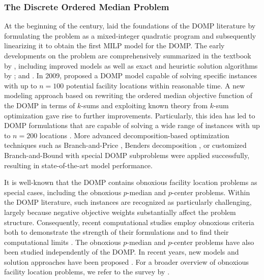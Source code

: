 \documentclass[letterpaper]{article}
\begin{document}
\subsubsection{The Discrete Ordered Median Problem}
At the beginning of the century, \citet{nickel_discrete_2001} laid the foundations of the DOMP literature by formulating the problem as a mixed-integer quadratic program and subsequently linearizing it to obtain the first MILP model for the DOMP. The early developments on the problem are comprehensively summarized in the textbook by \citet{nickel_puerto_2005}, including improved models as well as exact and heuristic solution algorithms by \citet{boland_exact_2006, DomnguezMarin2003}; and \citet{dominguez-marin_heuristic_2005}. In 2009, \citet{marin_flexible_2009} proposed a DOMP model capable of solving specific instances with up to $n = 100$ potential facility locations within reasonable time.  A new modeling approach based on rewriting the ordered median objective function of the DOMP in terms of $k$-sums and exploiting known theory from $k$-sum optimization \citep{nickel_velten_flexible_2017, puerto_revisiting_2017} gave rise to further improvements. Particularly, this idea has led to DOMP formulations that are capable of solving a wide range of instances with up to $n = 200$ locations \citep{marin_fresh_2020}. More advanced decomposition-based optimization techniques such as Branch-and-Price \citep{deleplanque_branch-price-and-cut_2020}, Benders decomposition \citep{ljubic_benders_2024}, or customized Branch-and-Bound with special DOMP subproblems \citep{cherkesly_ranking_2025} were applied successfully, resulting in state-of-the-art model performance.

It is well-known that the DOMP contains obnoxious facility location problems as special cases, including the obnoxious $p$-median and $p$-center problems. Within the DOMP literature, such instances are recognized as particularly challenging, largely because negative objective weights substantially affect the problem structure. Consequently, recent computational studies employ obnoxious criteria both to demonstrate the strength of their formulations and to find their computational limits \citep{ljubic_benders_2024, cherkesly_ranking_2025}. The obnoxious $p$-median and $p$-center problems have also been studied independently of the DOMP. In recent years, new models and solution approaches have been proposed \citep[see, e.g.,][]{chiang_obnox_2017, colmenar_obnox_grasp_2016, herran_obnox_vns_2020, bigler_matheuristic_2024, kalczynski_obnoxious_2026}. For a broader overview of obnoxious facility location problems, we refer to the survey by \citet{church_review_2022}.
\end{document}
